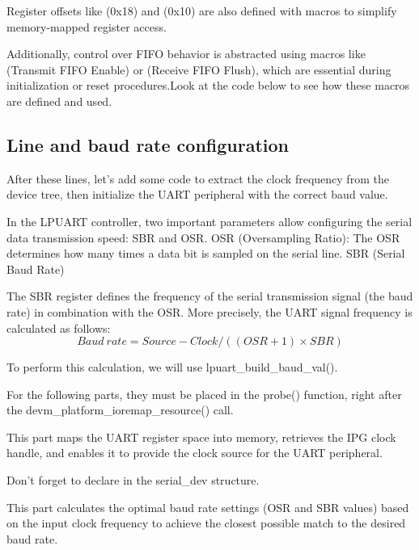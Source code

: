 Register offsets like  (0x18) and  (0x10) are also defined with macros to simplify memory-mapped register access.

Additionally, control over FIFO behavior is abstracted using macros like  (Transmit FIFO Enable) or  (Receive FIFO Flush), which are essential during initialization or reset procedures.Look at the code below to see how these macros are defined and used.

\subsection{Line and baud rate configuration}

After these lines, let’s add some code to extract the clock frequency from the device tree, then initialize the UART peripheral with the correct baud value.

In the LPUART controller, two important parameters allow configuring the serial data transmission speed: SBR and OSR.
OSR (Oversampling Ratio): The OSR determines how many times a data bit is sampled on the serial line.
SBR (Serial Baud Rate)

The SBR register defines the frequency of the serial transmission signal (the baud rate) in combination with the OSR. More precisely, the UART signal frequency is calculated as follows:
$$Baud\ rate = Source-Clock / ((OSR+1) × SBR)$$

To perform this calculation, we will use lpuart\_build\_baud\_val().


For the following parts, they must be placed in the probe() function, right after the devm\_platform\_ioremap\_resource() call.

This part maps the UART register space into memory, retrieves the IPG
clock handle, and enables it to provide the clock source for the UART
peripheral.

Don't forget to declare  in the serial\_dev structure.

This part calculates the optimal baud rate settings (OSR and SBR
values) based on the input clock frequency to achieve the closest
possible match to the desired baud rate.

